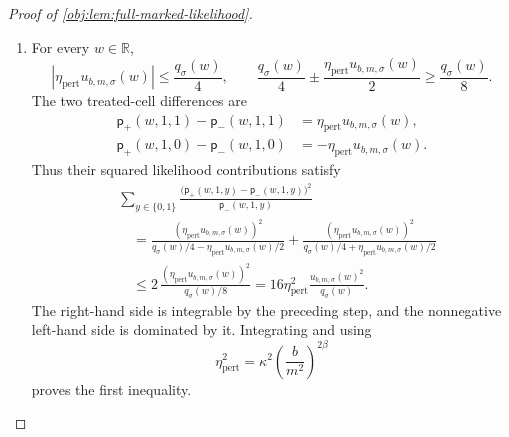 \documentclass[11pt]{article}
\begin{document}
\begin{proof}[Proof of \cref{obj:lem:full-marked-likelihood}]
\begin{enumerate}
\item For every \(w\in\mathbb R\),
\[
|\eta_{\mathrm{pert}}u_{b,m,\sigma}(w)|
\le\frac{q_\sigma(w)}4,
\qquad
\frac{q_\sigma(w)}4
\pm\frac{\eta_{\mathrm{pert}}u_{b,m,\sigma}(w)}2
\ge\frac{q_\sigma(w)}8.
\]
The two treated-cell differences are
\[
\begin{aligned}
\mathsf p_+(w,1,1)-\mathsf p_-(w,1,1)
&=\eta_{\mathrm{pert}}u_{b,m,\sigma}(w),\\
\mathsf p_+(w,1,0)-\mathsf p_-(w,1,0)
&=-\eta_{\mathrm{pert}}u_{b,m,\sigma}(w).
\end{aligned}
\]
Thus their squared likelihood contributions satisfy
\[
\begin{aligned}
&\sum_{y\in\{0,1\}}
\frac{\bigl(\mathsf p_+(w,1,y)-\mathsf p_-(w,1,y)\bigr)^2}
     {\mathsf p_-(w,1,y)}\\
&\quad=
\frac{(\eta_{\mathrm{pert}}u_{b,m,\sigma}(w))^2}
     {q_\sigma(w)/4-\eta_{\mathrm{pert}}u_{b,m,\sigma}(w)/2}
+
\frac{(\eta_{\mathrm{pert}}u_{b,m,\sigma}(w))^2}
     {q_\sigma(w)/4+\eta_{\mathrm{pert}}u_{b,m,\sigma}(w)/2}\\
&\quad\le
2\,\frac{(\eta_{\mathrm{pert}}u_{b,m,\sigma}(w))^2}{q_\sigma(w)/8}
=
16\eta_{\mathrm{pert}}^2
\frac{u_{b,m,\sigma}(w)^2}{q_\sigma(w)}.
\end{aligned}
\]
The right-hand side is integrable by the preceding step, and the nonnegative left-hand side is dominated by it. Integrating and using
\[
\eta_{\mathrm{pert}}^2
=\kappa^2\left(\frac{b}{m^2}\right)^{2\beta}
\]
proves the first inequality.


\end{enumerate}
\end{proof}
\end{document}
